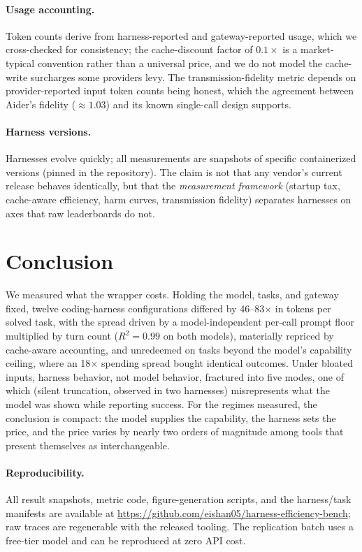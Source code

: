\documentclass[11pt]{article}
\begin{document}
\paragraph{Usage accounting.} Token counts derive from harness-reported and gateway-reported usage, which we cross-checked for consistency; the cache-discount factor of $0.1\times$ is a market-typical convention rather than a universal price, and we do not model the cache-write surcharges some providers levy. The transmission-fidelity metric depends on provider-reported input token counts being honest, which the agreement between Aider's fidelity ($\approx 1.03$) and its known single-call design supports.

\paragraph{Harness versions.} Harnesses evolve quickly; all measurements are snapshots of specific containerized versions (pinned in the repository). The claim is not that any vendor's current release behaves identically, but that the \emph{measurement framework} (startup tax, cache-aware efficiency, harm curves, transmission fidelity) separates harnesses on axes that raw leaderboards do not.

\section{Conclusion}
\label{sec:conclusion}

We measured what the wrapper costs. Holding the model, tasks, and gateway fixed, twelve coding-harness configurations differed by 46--83$\times$ in tokens per solved task, with the spread driven by a model-independent per-call prompt floor multiplied by turn count ($R^2 = 0.99$ on both models), materially repriced by cache-aware accounting, and unredeemed on tasks beyond the model's capability ceiling, where an 18$\times$ spending spread bought identical outcomes. Under bloated inputs, harness behavior, not model behavior, fractured into five modes, one of which (silent truncation, observed in two harnesses) misrepresents what the model was shown while reporting success. For the regimes measured, the conclusion is compact: the model supplies the capability, the harness sets the price, and the price varies by nearly two orders of magnitude among tools that present themselves as interchangeable.

\paragraph{Reproducibility.} All result snapshots, metric code, figure-generation scripts, and the harness/task manifests are available at \url{https://github.com/eishan05/harness-efficiency-bench}; raw traces are regenerable with the released tooling. The replication batch uses a free-tier model and can be reproduced at zero API cost.
\end{document}
